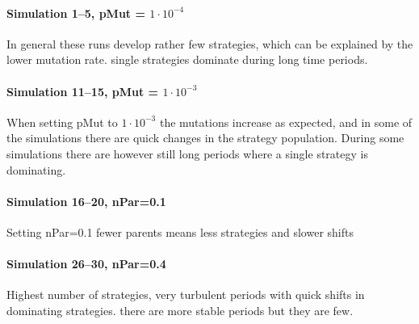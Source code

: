 \paragraph{Simulation 1--5, pMut = $1\cdot 10^{-4}$}
In general these runs develop rather few strategies, which can be explained by the lower mutation rate. single strategies dominate during long time periods. 




\paragraph{Simulation 11--15, pMut = $1\cdot 10^{-3}$}
When setting pMut to $1\cdot10^{-3}$ the mutations increase as expected, and in some of the simulations there are quick changes in the strategy population. During some simulations there are however still long periods where a single strategy is dominating.



\paragraph{Simulation 16--20, nPar=0.1}
Setting nPar=0.1 fewer parents means less strategies and slower shifts



\paragraph{Simulation 26--30, nPar=0.4}
Highest number of strategies, very turbulent periods with quick shifts in dominating strategies. there are more stable periods but they are few.

